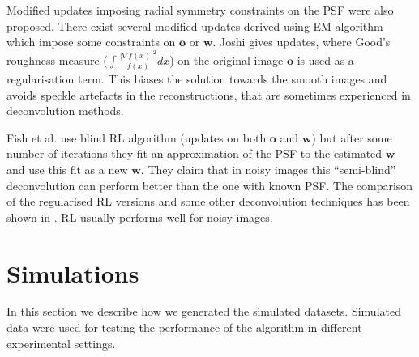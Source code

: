 Modified updates imposing radial symmetry constraints on the PSF were also proposed. There exist several modified updates derived using EM algorithm which impose some constraints on $\bm{o}$ or $\bm{w}$. Joshi \cite{Joshi:93} gives updates, where Good's roughness measure ($\int\frac{\left|\nabla f(x)\right|^2}{f(x)}dx$) on the original image $\bm{o}$ is used as a regularisation term. This biases the solution towards the smooth images and avoids speckle artefacts in the reconstructions, that are sometimes experienced in deconvolution methods. 

Fish et al. \cite{Fish1995} use blind RL algorithm (updates on both $\bm{o}$ and $\bm{w}$) but after some number of iterations they fit an approximation of the PSF to the estimated $\bm{w}$ and use this fit as a new $\bm{w}$. They claim that in noisy images this ``semi-blind'' deconvolution can perform better than the one with known PSF. The comparison of the regularised RL versions and some other deconvolution techniques has been shown in \cite{Kempen1997BA,Verveer1999}. RL usually performs well for noisy images.


\clearpage
\section{Simulations \label{sec:simulations}}
In this section we describe how we generated the simulated datasets. Simulated data were used for testing the performance of the algorithm in different experimental settings.

